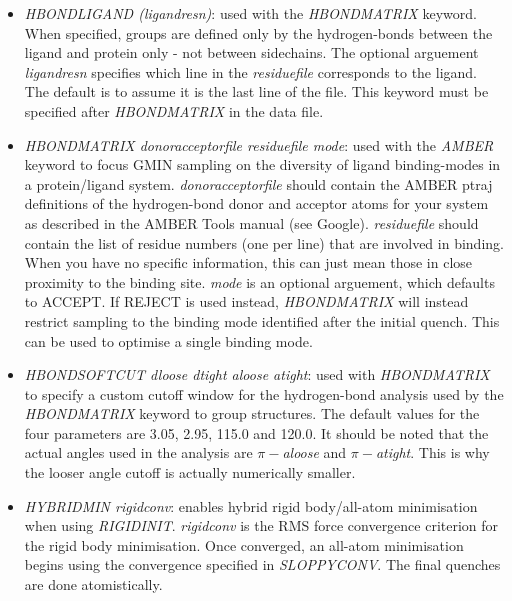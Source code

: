 \documentclass[12pt,a4paper,dvips]{article}
\begin{document}
\begin{itemize}

\item{\it HBONDLIGAND (ligandresn)\/}: used with the {\it HBONDMATRIX} keyword. When specified, groups are defined only
by the hydrogen-bonds between the ligand and protein only - not between sidechains. The optional arguement {\it ligandresn}
specifies which line in the {\it residuefile} corresponds to the ligand. The default is to assume it is the last line of the file.
This keyword must be specified after {\it HBONDMATRIX} in the data file.

\item{\it HBONDMATRIX donoracceptorfile residuefile mode\/}: used with the {\it AMBER} keyword to focus GMIN sampling on 
the diversity of ligand binding-modes in a protein/ligand system. {\it donoracceptorfile} should contain the AMBER ptraj
definitions of the hydrogen-bond donor and acceptor atoms for your system as described in the AMBER Tools manual (see Google).
{\it residuefile} should contain the list of residue numbers (one per line) that are involved in binding. When you have no 
specific information, this can just mean those in close proximity to the binding site. {\it mode} is an optional arguement, which
defaults to ACCEPT. If REJECT is used instead, {\it HBONDMATRIX} will instead restrict sampling to the binding mode identified after
the initial quench. This can be used to optimise a single binding mode.

\item{\it HBONDSOFTCUT dloose dtight aloose atight\/}: used with {\it HBONDMATRIX} to specify a custom cutoff window for the
hydrogen-bond analysis used by the {\it HBONDMATRIX} keyword to group structures. The default values for the four parameters are 
3.05, 2.95, 115.0 and 120.0. It should be noted that the actual angles used in the analysis are $\pi-${\it aloose} and 
$\pi-${\it atight}. This is why the looser angle cutoff is actually numerically smaller. 

\item{\it HYBRIDMIN rigidconv\/}: enables hybrid rigid body/all-atom minimisation when using {\it RIGIDINIT}. {\it rigidconv} is
the RMS force convergence criterion for the rigid body minimisation. Once converged, an all-atom minimisation begins using the
convergence specified in {\it SLOPPYCONV}. The final quenches are done atomistically.


\end{itemize}
\end{document}

